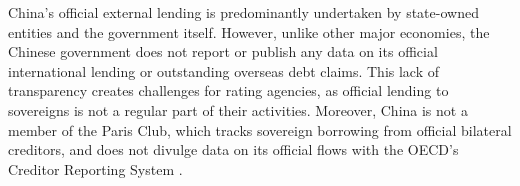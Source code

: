 China's official external lending is predominantly undertaken by state-owned entities and the government itself\footnotemark{}. However, unlike other major economies, the Chinese government does not report or publish any data on its official international lending or outstanding overseas debt claims. This lack of transparency creates challenges for rating agencies, as official lending to sovereigns is not a regular part of their activities. Moreover, China is not a member of the Paris Club, which tracks sovereign borrowing from official bilateral creditors, and does not divulge data on its official flows with the OECD's Creditor Reporting System \citep*{Horn-Reinhart-Trebesch-21}.


